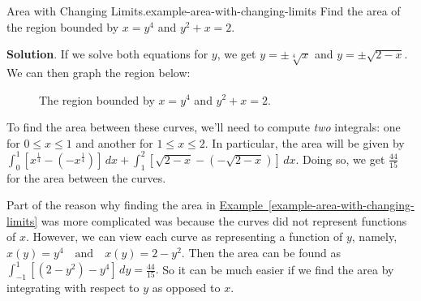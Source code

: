 \documentclass[10pt,]{book}
\numberwithin{equation}{section}
\begin{document}
\begin{example}{Area with Changing Limits.}{example-area-with-changing-limits}%
\hypertarget{p-620}{}%
Find the area of the region bounded by \(x = y^{4}\) and \(y^{2} + x = 2\).%
\par\smallskip%
\noindent\textbf{Solution}.\hypertarget{solution-135}{}\quad%
\hypertarget{p-621}{}%
If we solve both equations for \(y\), we get \(y = \pm\sqrt[4]{x}\) and \(y = \pm\sqrt{2 - x}\). We can then graph the region below:%
\begin{figure}
\centering
{
}
\caption{The region bounded by \(x = y^{4}\) and \(y^{2} + x = 2\).\label{figure-graph-between-x-curves}}
\end{figure}
\hypertarget{p-622}{}%
To find the area between these curves, we'll need to compute \emph{two} integrals: one for \(0\leq x\leq 1\) and another for \(1\leq x\leq 2\). In particular, the area will be given by \(\int_{0}^{1}[x^{\frac{1}{4}} - (-x^{\frac{1}{4}})]\,dx + \int_{1}^{2}[\sqrt{2 - x} - (-\sqrt{2 - x})]\,dx\). Doing so, we get \(\frac{44}{15}\) for the area between the curves.%
\end{example}
\hypertarget{p-623}{}%
Part of the reason why finding the area in \hyperref[example-area-with-changing-limits]{Example~\ref{example-area-with-changing-limits}} was more complicated was because the curves did not represent functions of \(x\). However, we can view each curve as representing a function of \(y\), namely, \(x(y) = y^{4} \quad\text{and}\quad x(y) = 2 - y^{2}.\) Then the area can be found as \(\int_{-1}^{1}[(2 - y^{2}) - y^{4}]\,dy = \frac{44}{15}.\) So it can be much easier if we find the area by integrating with respect to \(y\) as opposed to \(x\).%
\end{document}
